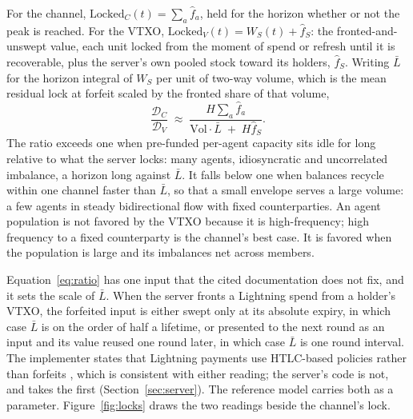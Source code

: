 \documentclass[11pt]{article}
\theoremstyle{plain}
\theoremstyle{definition}
\theoremstyle{remark}
\newcommand{\Dur}{\mathcal{D}}
\begin{document}
For the channel, $\mathrm{Locked}_C(t)=\sum_a\hat f_a$, held for the horizon whether or not the peak is reached. For the VTXO, $\mathrm{Locked}_V(t)=W_S(t)+\hat f_S$: the fronted-and-unswept value, each unit locked from the moment of spend or refresh until it is recoverable, plus the server's own pooled stock toward its holders, $\hat f_S$. Writing $\bar L$ for the horizon integral of $W_S$ per unit of two-way volume, which is the mean residual lock at forfeit scaled by the fronted share of that volume,
\begin{equation}
\frac{\Dur_C}{\Dur_V}\;\approx\;\frac{H\sum_a\hat f_a}{\mathrm{Vol}\cdot\bar L\;+\;H\hat f_S}.
\label{eq:ratio}
\end{equation}
The ratio exceeds one when pre-funded per-agent capacity sits idle for long relative to what the server locks: many agents, idiosyncratic and uncorrelated imbalance, a horizon long against $\bar L$. It falls below one when balances recycle within one channel faster than $\bar L$, so that a small envelope serves a large volume: a few agents in steady bidirectional flow with fixed counterparties. An agent population is not favored by the VTXO because it is high-frequency; high frequency to a fixed counterparty is the channel's best case. It is favored when the population is large and its imbalances net across members.

Equation~\eqref{eq:ratio} has one input that the cited documentation does not fix, and it sets the scale of $\bar L$. When the server fronts a Lightning spend from a holder's VTXO, the forfeited input is either swept only at its absolute expiry, in which case $\bar L$ is on the order of half a lifetime, or presented to the next round as an input and its value reused one round later, in which case $\bar L$ is one round interval. The implementer states that Lightning payments use HTLC-based policies rather than forfeits \citep{second2026forfeits}, which is consistent with either reading; the server's code is not, and takes the first (Section~\ref{sec:server}). The reference model carries both as a parameter. Figure~\ref{fig:locks} draws the two readings beside the channel's lock.


\end{document}
